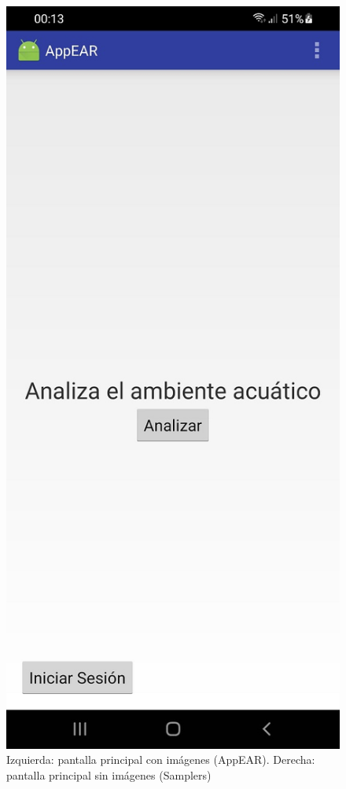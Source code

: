 \begin{figure}[H]
   \includegraphics[scale=0.3]{06-caso_de_uso/samplers_main.jpg} 
    \caption{Izquierda: pantalla principal con imágenes (AppEAR). Derecha:  pantalla principal sin imágenes (Samplers)}
\end{figure}

